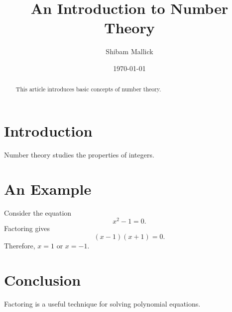 \documentclass[12pt,a4paper]{article}
\title{An Introduction to Number Theory}
\author{Shibam Mallick}
\date{\today}
\begin{document}
\maketitle

\begin{abstract}
This article introduces basic concepts
of number theory.
\end{abstract}

\section{Introduction}
Number theory studies the properties
of integers.

\section{An Example}
Consider the equation
\[
x^2 - 1 = 0.
\]
Factoring gives
\[
(x-1)(x+1)=0.
\]
Therefore, \(x=1\) or \(x=-1\).

\section{Conclusion}
Factoring is a useful technique
for solving polynomial equations.
\end{document}
